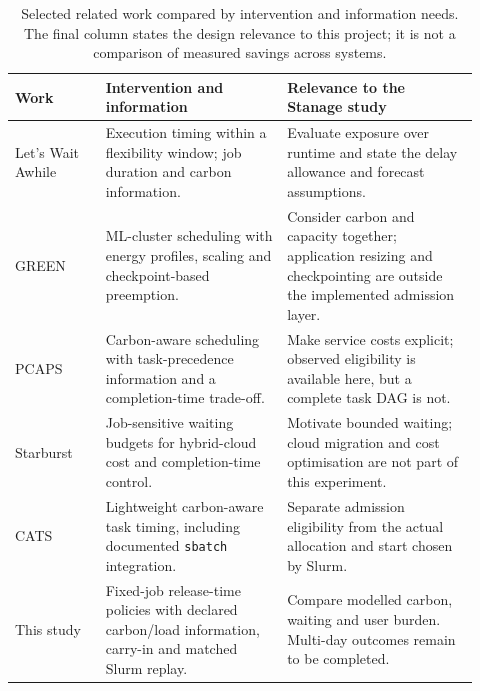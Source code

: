\begin{table}[htbp]
\centering
\small
\caption[Related work and its relevance to admission control]{Selected related work compared by intervention and information needs. The final column states the design relevance to this project; it is not a comparison of measured savings across systems.}
\label{tab:related-work-boundary}
\setlength{\tabcolsep}{4pt}
\renewcommand{\arraystretch}{1.2}
\begin{tabular}{>{\raggedright\arraybackslash}p{0.18\linewidth}>{\raggedright\arraybackslash}p{0.36\linewidth}>{\raggedright\arraybackslash}p{0.38\linewidth}}
\toprule
Work & Intervention and information & Relevance to the Stanage study \\
\midrule
Let's Wait Awhile~\citep{wiesner2021wait} & Execution timing within a flexibility window; job duration and carbon information. & Evaluate exposure over runtime and state the delay allowance and forecast assumptions. \\
GREEN~\citep{xu2025green} & ML-cluster scheduling with energy profiles, scaling and checkpoint-based preemption. & Consider carbon and capacity together; application resizing and checkpointing are outside the implemented admission layer. \\
PCAPS~\citep{lechowicz2025pcaps} & Carbon-aware scheduling with task-precedence information and a completion-time trade-off. & Make service costs explicit; observed eligibility is available here, but a complete task DAG is not. \\
Starburst~\citep{luo2024starburst} & Job-sensitive waiting budgets for hybrid-cloud cost and completion-time control. & Motivate bounded waiting; cloud migration and cost optimisation are not part of this experiment. \\
CATS~\citep{cats2025,catsSchedulers} & Lightweight carbon-aware task timing, including documented \texttt{sbatch} integration. & Separate admission eligibility from the actual allocation and start chosen by Slurm. \\
This study & Fixed-job release-time policies with declared carbon/load information, carry-in and matched Slurm replay. & Compare modelled carbon, waiting and user burden. Multi-day outcomes remain to be completed. \\
\bottomrule
\end{tabular}
\end{table}

